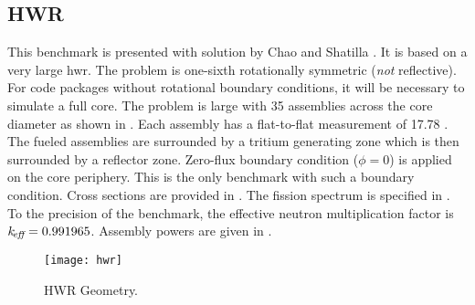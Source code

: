     \restoregeometry
    \pagestyle{plain}
    \thispagestyle{plain}

  \subsection{HWR}
    \label{sec:hwr}
    This benchmark is presented with solution by Chao and Shatilla \cite{chao}. 
    It is based on a
    very large \gls{hwr}. The problem is one-sixth rotationally symmetric 
    (\textit{not} reflective). For code packages without rotational boundary 
    conditions, it will be necessary to simulate a full core. The problem is 
    large with 35 assemblies across the core diameter as shown in 
    . Each assembly has a flat-to-flat measurement of 17.78
    . The fueled assemblies are surrounded by a tritium 
    generating zone which is then surrounded by a reflector zone. Zero-flux 
    boundary condition ($\phi = 0$) is applied on the core periphery. This is 
    the only benchmark with such a boundary condition. Cross sections are 
    provided in . The fission spectrum is specified in 
    . To the precision of the benchmark, the effective neutron 
    multiplication factor is $k_{\!\mbox{\scriptsize \em eff}} = 0.991965$. Assembly powers are given in 
    .

    \begin{figure}
      \centering
      \texttt{[image: hwr]}
      \caption{HWR Geometry.}
      \label{fig:hwr_geom}
    \end{figure}

